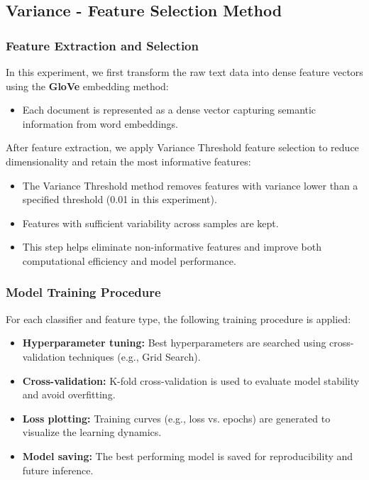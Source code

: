 \subsection{Variance - Feature Selection Method}
\subsubsection{Feature Extraction and Selection}

In this experiment, we first transform the raw text data into dense feature vectors using the \textbf{GloVe} embedding method:
\begin{itemize}
    \item Each document is represented as a dense vector capturing semantic information from word embeddings.
\end{itemize}

After feature extraction, we apply Variance Threshold feature selection to reduce dimensionality and retain the most informative features:
\begin{itemize}
    \item The Variance Threshold method removes features with variance lower than a specified threshold (0.01 in this experiment).
    \item Features with sufficient variability across samples are kept.
    \item This step helps eliminate non-informative features and improve both computational efficiency and model performance.
\end{itemize}

\subsubsection{Model Training Procedure}

For each classifier and feature type, the following training procedure is applied:
\begin{itemize}
    \item \textbf{Hyperparameter tuning:} Best hyperparameters are searched using cross-validation techniques (e.g., Grid Search).
    \item \textbf{Cross-validation:} K-fold cross-validation is used to evaluate model stability and avoid overfitting.
    \item \textbf{Loss plotting:} Training curves (e.g., loss vs. epochs) are generated to visualize the learning dynamics.
    \item \textbf{Model saving:} The best performing model is saved for reproducibility and future inference.
\end{itemize}

